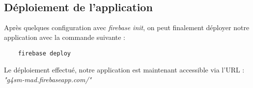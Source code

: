 \subsection{Déploiement de l'application}
Après quelques configuration avec \emph{firebase init}, on peut finalement déployer notre application avec la commande suivante : 

\begin{verbatim}
	firebase deploy
\end{verbatim}

Le déploiement effectué, notre application est maintenant accessible via l'URL : \\ \emph{"g4sm-mad.firebaseapp.com/"}